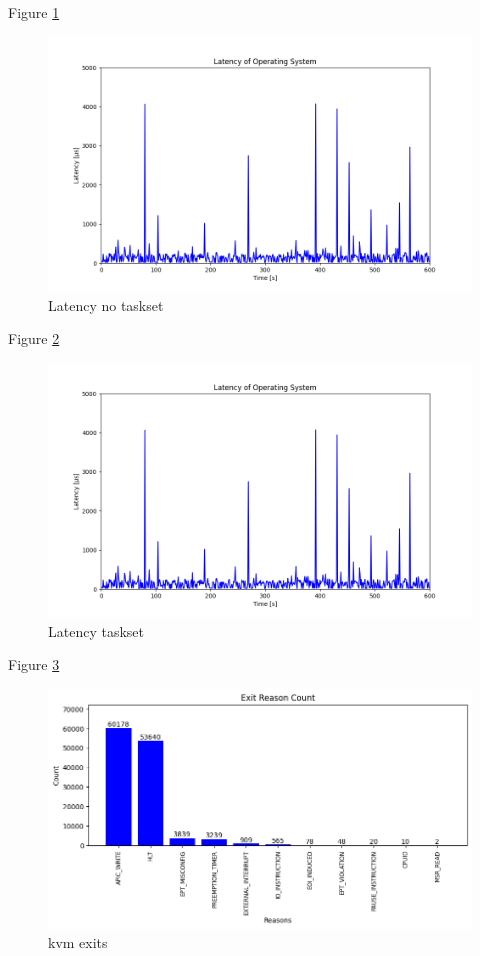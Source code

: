 \documentclass[MMR,Master,english]{twbook}
\begin{document}
 
 
 Figure \ref{fig:latency_no_taskset}
 
 \begin{figure}[H]
     \centering
     \includegraphics[width=0.8\columnwidth]{img/latency_no_taskset.png}
     \caption[Latency no taskset]{Latency no taskset}
     \label{fig:latency_no_taskset}
   \end{figure}
 
 
   Figure \ref{fig:latency_taskset}
   \begin{figure}[H]
     \centering
     \includegraphics[width=0.8\columnwidth]{img/latency_taskset.png}
     \caption[Latency taskset]{Latency taskset}
     \label{fig:latency_taskset}
   \end{figure}
 
 Figure \ref{fig:kvm_exits}
 \begin{figure}[H]
     \centering
     \includegraphics[width=0.8\columnwidth]{img/kvm_exits.png}
     \caption[kvm exits]{kvm exits}
     \label{fig:kvm_exits}
   \end{figure}
 
\end{document}
